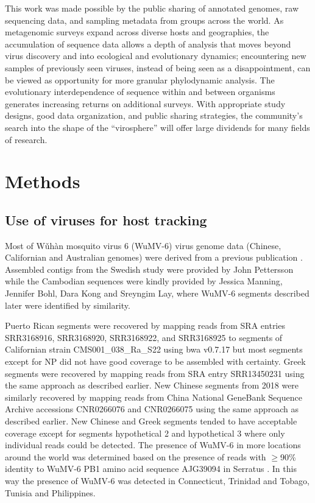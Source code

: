 \documentclass[11pt]{article}
\begin{document}
This work was made possible by the public sharing of annotated genomes, raw sequencing data, and sampling metadata from groups across the world.
As metagenomic surveys expand across diverse hosts and geographies, the accumulation of sequence data allows a depth of analysis that moves beyond virus discovery and into ecological and evolutionary dynamics; encountering new samples of previously seen viruses, instead of being seen as a disappointment, can be viewed as opportunity for more granular phylodynamic analysis.
The evolutionary interdependence of sequence within and between organisms generates increasing returns on additional surveys.
With appropriate study designs, good data organization, and public sharing strategies, the community's search into the shape of the ``virosphere'' will offer large dividends for many fields of research.


\section{Methods}

\subsection{Use of viruses for host tracking}

Most of W\v{u}h\`{a}n mosquito virus 6 (WuMV-6) virus genome data (Chinese, Californian and Australian genomes) were derived from a previous publication \citep{batson_single_2021}.
Assembled contigs from the Swedish study \citep{pettersson_meta-transcriptomic_2019} were provided by John Pettersson while the Cambodian sequences were kindly provided by Jessica Manning, Jennifer Bohl, Dara Kong and Sreyngim Lay, where WuMV-6 segments described later \citep{batson_single_2021} were identified by similarity.

Puerto Rican segments were recovered by mapping reads from SRA entries SRR3168916, SRR3168920, SRR3168922, and SRR3168925 \citep{frey_bioinformatic_2016} to segments of Californian strain CMS001\_038\_Ra\_S22 using bwa v0.7.17 \citep{li_fast_2009} but most segments except for NP did not have good coverage to be assembled with certainty.
Greek segments were recovered by mapping reads from SRA entry SRR13450231 \citep{konstantinidis_defining_2021} using the same approach as described earlier.
New Chinese segments from 2018 \citep{he_metagenomic_2021} were similarly recovered by mapping reads from China National GeneBank Sequence Archive accessions CNR0266076 and CNR0266075 using the same approach as described earlier.
New Chinese and Greek segments tended to have acceptable coverage except for segments hypothetical 2 and hypothetical 3 where only individual reads could be detected.
The presence of WuMV-6 in more locations around the world was determined based on the presence of reads with $\geq$90\% identity to WuMV-6 PB1 amino acid sequence AJG39094 in Serratus \citep{edgar_petabase-scale_2022}.
In this way the presence of WuMV-6 was detected in Connecticut, Trinidad and Tobago, Tunisia and Philippines.
\end{document}
